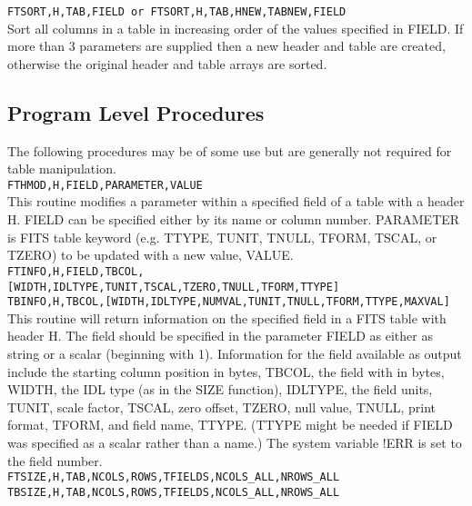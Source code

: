 {\tt FTSORT,H,TAB,FIELD or FTSORT,H,TAB,HNEW,TABNEW,FIELD} \\

        Sort all columns in a table in increasing order of the values
        specified in FIELD.  If more than 3 parameters are supplied
        then a new header and table are created, otherwise the original
        header and table arrays are sorted. \\

\subsection{Program Level Procedures}

    The following procedures may be of some use but are generally
    not required for table manipulation. \\
 
{\tt FTHMOD,H,FIELD,PARAMETER,VALUE} \\

        This routine modifies a parameter within a specified field
        of a table with a header H.  FIELD can be specified either
        by its name or column number.  PARAMETER is FITS table keyword
        (e.g. TTYPE, TUNIT, TNULL, TFORM, TSCAL, or TZERO) to be
        updated with a new value, VALUE.  \\

{\tt FTINFO,H,FIELD,TBCOL,[WIDTH,IDLTYPE,TUNIT,TSCAL,TZERO,TNULL,TFORM,TTYPE]}\\
{\tt TBINFO,H,TBCOL,[WIDTH,IDLTYPE,NUMVAL,TUNIT,TNULL,TFORM,TTYPE,MAXVAL]} \\
   
	This routine will return information on the specified field
        in a FITS table with header H.  The field should be specified 
        in the parameter FIELD as either as string or a scalar 
        (beginning with 1).  Information for the field available as 
        output include the starting column position in bytes, TBCOL, 
        the field with in bytes, WIDTH, the IDL type (as in the SIZE 
        function), IDLTYPE, the field units, TUNIT, scale factor, 
        TSCAL, zero offset, TZERO, null value, TNULL, print format,
        TFORM, and field name, TTYPE.  (TTYPE might be needed if FIELD 
        was specified as a scalar rather than a name.) The system
        variable !ERR is set to the field number. \\
 
{\tt FTSIZE,H,TAB,NCOLS,ROWS,TFIELDS,NCOLS\_ALL,NROWS\_ALL} \\
{\tt TBSIZE,H,TAB,NCOLS,ROWS,TFIELDS,NCOLS\_ALL,NROWS\_ALL} \\
 
